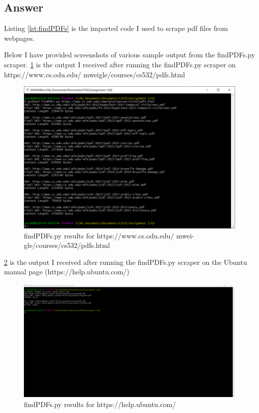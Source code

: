 \documentclass[12pt]{article}
\begin{document}
\subsection*{Answer}
Listing \ref{lst:findPDFs} is the imported code I used to scrape pdf files from webpages.



Below I have provided screenshots of various sample output from the findPDFs.py scraper. 
\ref{fig:q3ResponseWeigle} is the output I received after running the findPDFs.py scraper on https://www.cs.odu.edu/ mweigle/courses/cs532/pdfs.html 
\begin{figure}[h]
    \centering
    \includegraphics[trim=0 20 10 50, clip, width=\textwidth] {Q3/q3_weiglePdfs.png}
    \caption{findPDFs.py results for https://www.cs.odu.edu/ mwei-
gle/courses/cs532/pdfs.html}
    \label{fig:q3ResponseWeigle}
\end{figure}

\ref{fig:q3ResponseUbuntu} is the output I received after running the findPDFs.py scraper on the Ubuntu manual page (https://help.ubuntu.com/)
\begin{figure}[h]
    \centering
    \includegraphics[trim=0 20 10 50, clip, width=\textwidth] {Q3/q3_ubuntuHelp.png}
    \caption{findPDFs.py results for https://help.ubuntu.com/}
    \label{fig:q3ResponseUbuntu}
\end{figure}
\end{document}
